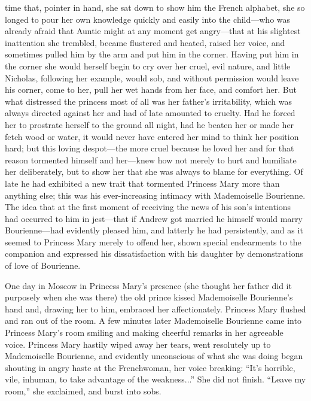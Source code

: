 time that, pointer in hand, she sat down to show him the French
alphabet, she so longed to pour her own knowledge quickly and
easily into the child---who was already afraid that Auntie might
at any moment get angry---that at his slightest inattention she
trembled, became flustered and heated, raised her voice, and
sometimes pulled him by the arm and put him in the corner. Having
put him in the corner she would herself begin to cry over her
cruel, evil nature, and little Nicholas, following her example,
would sob, and without permission would leave his corner, come to
her, pull her wet hands from her face, and comfort her.  But what
distressed the princess most of all was her father's
irritability, which was always directed against her and had of
late amounted to cruelty. Had he forced her to prostrate herself
to the ground all night, had he beaten her or made her fetch wood
or water, it would never have entered her mind to think her
position hard; but this loving despot---the more cruel because he
loved her and for that reason tormented himself and her---knew
how not merely to hurt and humiliate her deliberately, but to
show her that she was always to blame for everything. Of late he
had exhibited a new trait that tormented Princess Mary more than
anything else; this was his ever-increasing intimacy with
Mademoiselle Bourienne. The idea that at the first moment of
receiving the news of his son's intentions had occurred to him in
jest---that if Andrew got married he himself would marry
Bourienne---had evidently pleased him, and latterly he had
persistently, and as it seemed to Princess Mary merely to offend
her, shown special endearments to the companion and expressed his
dissatisfaction with his daughter by demonstrations of love of
Bourienne.

One day in Moscow in Princess Mary's presence (she thought her
father did it purposely when she was there) the old prince kissed
Mademoiselle Bourienne's hand and, drawing her to him, embraced
her affectionately.  Princess Mary flushed and ran out of the
room. A few minutes later Mademoiselle Bourienne came into
Princess Mary's room smiling and making cheerful remarks in her
agreeable voice. Princess Mary hastily wiped away her tears, went
resolutely up to Mademoiselle Bourienne, and evidently
unconscious of what she was doing began shouting in angry haste
at the Frenchwoman, her voice breaking: ``It's horrible, vile,
inhuman, to take advantage of the weakness...'' She did not
finish.  ``Leave my room,'' she exclaimed, and burst into sobs.

